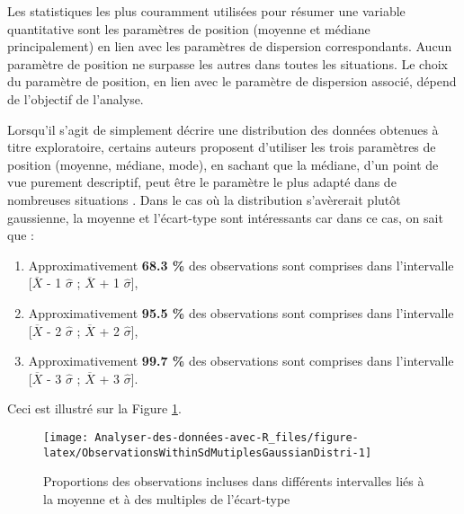 \documentclass[
]{book}
\providecommand{\tightlist}{%
  \setlength{\itemsep}{0pt}\setlength{\parskip}{0pt}}
\begin{document}
Les statistiques les plus couramment utilisées pour résumer une variable quantitative sont les paramètres de position (moyenne et médiane principalement) en lien avec les paramètres de dispersion correspondants. Aucun paramètre de position ne surpasse les autres dans toutes les situations. Le choix du paramètre de position, en lien avec le paramètre de dispersion associé, dépend de l'objectif de l'analyse.

Lorsqu'il s'agit de simplement décrire une distribution des données obtenues à titre exploratoire, certains auteurs proposent d'utiliser les trois paramètres de position (moyenne, médiane, mode), en sachant que la médiane, d'un point de vue purement descriptif, peut être le paramètre le plus adapté dans de nombreuses situations \autocite{gonzalesMeasuresCentralTendency2001}. Dans le cas où la distribution s'avèrerait plutôt gaussienne, la moyenne et l'écart-type sont intéressants car dans ce cas, on sait que :

\begin{enumerate}
\def\labelenumi{\arabic{enumi}.}
\tightlist
\item
  Approximativement \textbf{68.3 \%} des observations sont comprises dans l'intervalle {[}\(\overline{X}\) - 1 \(\hat{\sigma}\) ; \(\overline{X}\) + 1 \(\hat{\sigma}\){]},
\item
  Approximativement \textbf{95.5 \%} des observations sont comprises dans l'intervalle {[}\(\overline{X}\) - 2 \(\hat{\sigma}\) ; \(\overline{X}\) + 2 \(\hat{\sigma}\){]},
\item
  Approximativement \textbf{99.7 \%} des observations sont comprises dans l'intervalle {[}\(\overline{X}\) - 3 \(\hat{\sigma}\) ; \(\overline{X}\) + 3 \(\hat{\sigma}\){]}.
\end{enumerate}

Ceci est illustré sur la Figure \ref{fig:ObservationsWithinSdMutiplesGaussianDistri}.

\begin{figure}

{\centering \texttt{[image: Analyser-des-données-avec-R\_files/figure-latex/ObservationsWithinSdMutiplesGaussianDistri-1]} 

}

\caption{Proportions des observations incluses dans différents intervalles liés à la moyenne et à des multiples de l'écart-type}\label{fig:ObservationsWithinSdMutiplesGaussianDistri}
\end{figure}
\end{document}

